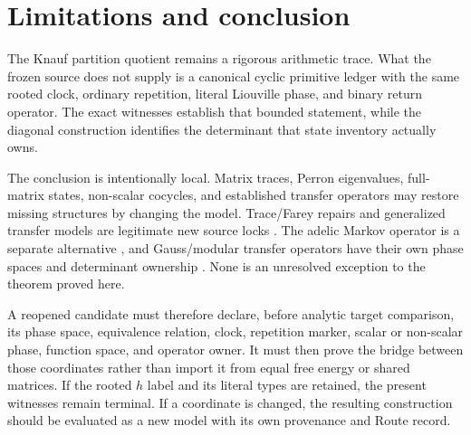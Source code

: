 \section{Limitations and conclusion}
\label{sec:conclusion}

The Knauf partition quotient remains a rigorous arithmetic trace.  What the
frozen source does not supply is a canonical cyclic primitive ledger with the
same rooted clock, ordinary repetition, literal Liouville phase, and binary
return operator.  The exact witnesses establish that bounded statement,
while the diagonal construction identifies the determinant that state
inventory actually owns.

The conclusion is intentionally local.  Matrix traces, Perron eigenvalues,
full-matrix states, non-scalar cocycles, and established transfer operators
may restore missing structures by changing the model.  Trace/Farey repairs
and generalized transfer models are legitimate new source locks
\citep{klebanOzluk1999farey,fialaKleban2005generalized,prellbergFialaKleban2006cluster}.
The adelic Markov operator is a separate alternative
\citep{knauf2013adelic}, and Gauss/modular transfer operators have their own
phase spaces and determinant ownership
\citep{mayer1990gauss,mayer1991selberg}.  None is an unresolved exception to
the theorem proved here.

A reopened candidate must therefore declare, before analytic target
comparison, its phase space, equivalence relation, clock, repetition marker,
scalar or non-scalar phase, function space, and operator owner.  It must then
prove the bridge between those coordinates rather than import it from equal
free energy or shared matrices.  If the rooted $h$ label and its literal
types are retained, the present witnesses remain terminal.  If a coordinate
is changed, the resulting construction should be evaluated as a new model
with its own provenance and Route record.
